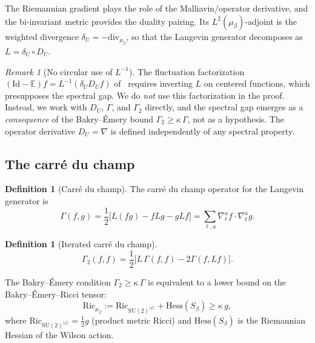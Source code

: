 \documentclass[11pt,a4paper]{article}
\theoremstyle{plain}
\theoremstyle{definition}
\newtheorem{definition}[theorem]{Definition}
\theoremstyle{remark}
\newtheorem{remark}[theorem]{Remark}
\newcommand{\Id}{\mathrm{Id}}
\newcommand{\E}{\mathbb{E}}
\newcommand{\SU}{\mathrm{SU}}
\newcommand{\Ric}{\mathrm{Ric}}
\newcommand{\Hess}{\mathrm{Hess}}
\newcommand{\cL}{\mathcal{L}}
\begin{document}
The Riemannian gradient plays the role of the Malliavin/operator
derivative, and the bi-invariant metric provides the duality pairing.
Its $L^2(\mu_\beta)$-adjoint is the weighted divergence
$\delta_U = -\mathrm{div}_{\mu_\beta}$, so that the Langevin
generator decomposes as $L = \delta_U \circ D_U$.

\begin{remark}[No circular use of $L^{-1}$]
The fluctuation factorization
$(\Id - \E)f = L^{-1}(\delta_U D_U f)$ of~\cite{Fontes2026a} requires
inverting $L$ on centered functions, which presupposes the spectral gap.
We do \emph{not} use this factorization in the proof. Instead, we work
with $D_U$, $\Gamma$, and $\Gamma_2$ directly, and the spectral gap
emerges as a \emph{consequence} of the Bakry--\'Emery bound
$\Gamma_2 \geq \kappa\,\Gamma$, not as a hypothesis. The operator
derivative $D_U = \nabla$ is defined independently of any spectral
property.
\end{remark}


\subsection{The carr\'e du champ}

\begin{definition}[Carr\'e du champ]
The carr\'e du champ operator for the Langevin generator is
\begin{equation}
\Gamma(f,g) = \frac{1}{2}\bigl[L(fg) - fLg - gLf\bigr]
= \sum_{\ell,a} \nabla_\ell^a f \cdot \nabla_\ell^a g.
\end{equation}
\end{definition}

\begin{definition}[Iterated carr\'e du champ]
\begin{equation}
\Gamma_2(f,f) = \frac{1}{2}\bigl[L\,\Gamma(f,f) - 2\Gamma(f, Lf)\bigr].
\end{equation}
\end{definition}

The Bakry--\'Emery condition $\Gamma_2 \geq \kappa\,\Gamma$ is
equivalent to a lower bound on the Bakry--\'Emery--Ricci tensor:
\begin{equation}\label{eq:BE-Ricci}
\Ric_{\mu_\beta} := \Ric_{\SU(2)^{|\cL|}} + \Hess(S_\beta) \geq \kappa\,g,
\end{equation}
where $\Ric_{\SU(2)^{|\cL|}} = \frac{1}{2}g$ (product metric Ricci)
and $\Hess(S_\beta)$ is the Riemannian Hessian of the Wilson action.
\end{document}
